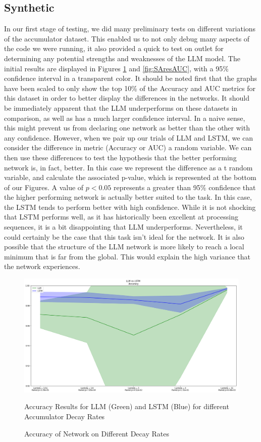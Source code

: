 \subsection{Synthetic}
In our first stage of testing, we did many preliminary tests on different variations of the accumulator dataset. This enabled us to not only debug many aspects of the code we were running, it also provided a quick to test on outlet for determining any potential strengths and weaknesses of the LLM model. The initial results are displayed in Figures \ref{fig:SAres} and \ref{fig:SAresAUC}, with a 95\% confidence interval in a transparent color. It should be noted first that the graphs have been scaled to only show the top 10\% of the Accuracy and AUC metrics for this dataset in order to better display the differences in the networks.  It should be immediately apparent that the LLM underperforms on these datasets in comparison, as well as has a much larger confidence interval. In a naive sense, this might prevent us from declaring one network as better than the other with any confidence. However, when we pair up our trials of LLM and LSTM, we can consider the difference in metric (Accuracy or AUC) a random variable. We can then use these differences to test the hypothesis that the better performing network is, in fact, better. In this case we represent the difference as a t random variable, and calculate the associated p-value, which is represented at the bottom of our Figures. A value of $p<0.05$ represents a greater than 95\% confidence that the higher performing network is actually better suited to the task. In this case, the LSTM tends to perform better with high confidence. While it is not shocking that LSTM performs well, as it has historically been excellent at processing sequences, it is a bit disappointing that LLM underperforms. Nevertheless, it could certainly be the case that this task isn't ideal for the network. It is also possible that the structure of the LLM network is more likely to reach a local minimum that is far from the global. This would explain the high variance that the network experiences. 
\label{ResSubSec}
\begin{figure}
    \centering
    \includegraphics[width=1.0\textwidth]{figures/Synth_Accum_Data_Results.png}
    \caption{Accuracy of Network on Different Decay Rates}
    \label{fig:SAres}
    Accuracy Results for LLM (Green) and LSTM (Blue) for different Accumulator Decay Rates
\end{figure}

